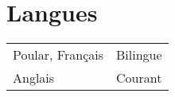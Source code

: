 \documentclass[a4paper,12pt]{article}
\begin{document}


\section{Langues}
\begin{tabularx}{\linewidth}{@{}l X@{}}
Poular, Français & \normalsize{Bilingue}\\
Anglais & \normalsize{Courant}\\
\end{tabularx}



\vfill
{}
\end{document}
